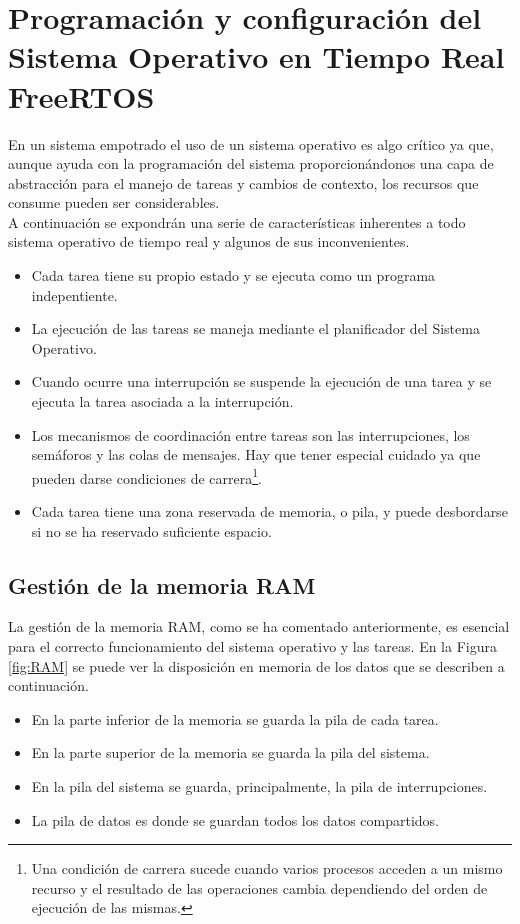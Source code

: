 \section{Programación y configuración del Sistema Operativo en Tiempo Real FreeRTOS}
\label{obj6}
En un sistema empotrado el uso de un sistema operativo es algo crítico ya que, aunque ayuda con la programación del sistema proporcionándonos una capa de abstracción para el manejo de tareas y cambios de contexto, los recursos que consume pueden ser considerables.\\

A continuación se expondrán una serie de características inherentes a todo sistema operativo de tiempo real y algunos de sus inconvenientes.\\

\begin{itemize}
\item Cada tarea tiene su propio estado y se ejecuta como un programa indepentiente.
\item La ejecución de las tareas se maneja mediante el planificador del Sistema Operativo.
\item Cuando ocurre una interrupción se suspende la ejecución de una tarea y se ejecuta la tarea asociada a la interrupción.
\item Los mecanismos de coordinación entre tareas son las interrupciones, los semáforos y las colas de mensajes. Hay que tener especial cuidado ya que pueden darse condiciones de carrera\footnote{Una condición de carrera sucede cuando varios procesos acceden a un mismo recurso y el resultado de las operaciones cambia dependiendo del orden de ejecución de las mismas.}.
\item Cada tarea tiene una zona reservada de memoria, o pila, y puede desbordarse si no se ha reservado suficiente espacio.\\
\end{itemize}

\subsection{Gestión de la memoria RAM}
La gestión de la memoria RAM, como se ha comentado anteriormente, es esencial para el correcto funcionamiento del sistema operativo y las tareas. En la Figura \ref{fig:RAM} se puede ver la disposición en memoria de los datos que se describen a continuación.
\begin{itemize}
\item En la parte inferior de la memoria se guarda la pila de cada tarea.
\item En la parte superior de la memoria se guarda la pila del sistema.
\item En la pila del sistema se guarda, principalmente, la pila de interrupciones.
\item La pila de datos es donde se guardan todos los datos compartidos.\\
\end{itemize}

